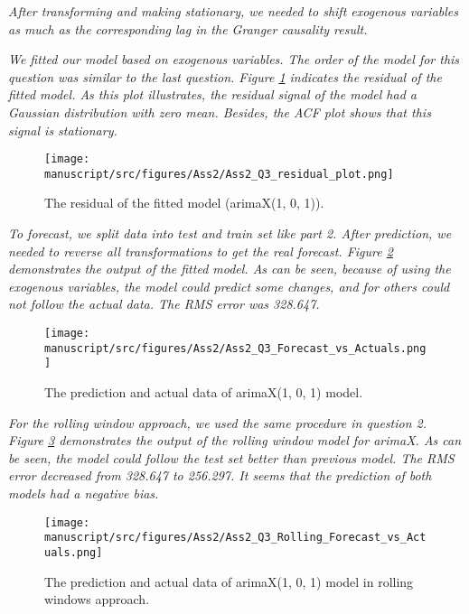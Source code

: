 \textit{After transforming and making stationary, we needed to shift exogenous variables as much as the corresponding lag in the Granger causality result.}

\textit{We fitted our model based on exogenous variables. The order of the model for this question was similar to the last question. Figure \ref{fig:Ass2_Q3_residual_plot} indicates the residual of the fitted model. As this plot illustrates, the residual signal of the model had a Gaussian distribution with zero mean. Besides, the \gls{ACF} plot shows that this signal is stationary.}



\begin{figure}[H]
    \centering
    \begin{minipage}[b]{1\textwidth}
        \texttt{[image: manuscript/src/figures/Ass2/Ass2\_Q3\_residual\_plot.png]}
    \end{minipage}
    \caption{The residual of the fitted model (\gls{arima}X(1, 0, 1)).}
    \label{fig:Ass2_Q3_residual_plot}
\end{figure}

\textit{To forecast, we split data into test and train set like part 2. After prediction, we needed to reverse all transformations to get the real forecast. Figure \ref{fig:Ass2_Q3_Forecast_vs_Actuals} demonstrates the output of the fitted model. As can be seen, because of using the exogenous variables, the model could predict some changes, and for others could not follow the actual data. The RMS error was 328.647.} 

\begin{figure}[H]
    \centering
    \begin{minipage}[b]{1\textwidth}
        \texttt{[image: manuscript/src/figures/Ass2/Ass2\_Q3\_Forecast\_vs\_Actuals.png]}
    \end{minipage}
    \caption{The prediction and actual data of \gls{arima}X(1, 0, 1) model.}
    \label{fig:Ass2_Q3_Forecast_vs_Actuals}
\end{figure}





\textit{For the rolling window approach, we used the same procedure in question 2. Figure \ref{fig:Ass2_Q3_Rolling_Forecast_vs_Actuals} demonstrates the output of the rolling window model for \gls{arima}X. As can be seen, the model could follow the test set better than previous model. The RMS error decreased from 328.647 to 256.297. It seems that the prediction of both models had a negative bias.}

\begin{figure}[H]
    \centering
    \begin{minipage}[b]{1\textwidth}
        \texttt{[image: manuscript/src/figures/Ass2/Ass2\_Q3\_Rolling\_Forecast\_vs\_Actuals.png]}
    \end{minipage}
    \caption{The prediction and actual data of \gls{arima}X(1, 0, 1) model in rolling windows approach.}
    \label{fig:Ass2_Q3_Rolling_Forecast_vs_Actuals}
\end{figure}








